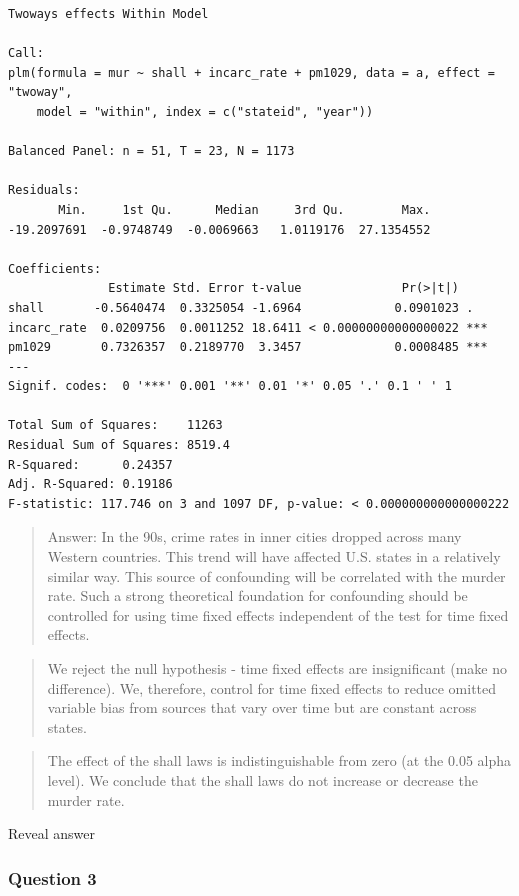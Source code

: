\documentclass[]{article}
\theoremstyle{definition}
\theoremstyle{definition}
\theoremstyle{definition}
\theoremstyle{remark}
\begin{document}
\begin{verbatim}
Twoways effects Within Model

Call:
plm(formula = mur ~ shall + incarc_rate + pm1029, data = a, effect = "twoway", 
    model = "within", index = c("stateid", "year"))

Balanced Panel: n = 51, T = 23, N = 1173

Residuals:
       Min.     1st Qu.      Median     3rd Qu.        Max. 
-19.2097691  -0.9748749  -0.0069663   1.0119176  27.1354552 

Coefficients:
              Estimate Std. Error t-value              Pr(>|t|)    
shall       -0.5640474  0.3325054 -1.6964             0.0901023 .  
incarc_rate  0.0209756  0.0011252 18.6411 < 0.00000000000000022 ***
pm1029       0.7326357  0.2189770  3.3457             0.0008485 ***
---
Signif. codes:  0 '***' 0.001 '**' 0.01 '*' 0.05 '.' 0.1 ' ' 1

Total Sum of Squares:    11263
Residual Sum of Squares: 8519.4
R-Squared:      0.24357
Adj. R-Squared: 0.19186
F-statistic: 117.746 on 3 and 1097 DF, p-value: < 0.000000000000000222
\end{verbatim}

\begin{quote}
Answer: In the 90s, crime rates in inner cities dropped across many
Western countries. This trend will have affected U.S. states in a
relatively similar way. This source of confounding will be correlated
with the murder rate. Such a strong theoretical foundation for
confounding should be controlled for using time fixed effects
independent of the test for time fixed effects.
\end{quote}

\begin{quote}
We reject the null hypothesis - time fixed effects are insignificant
(make no difference). We, therefore, control for time fixed effects to
reduce omitted variable bias from sources that vary over time but are
constant across states.
\end{quote}

\begin{quote}
The effect of the shall laws is indistinguishable from zero (at the 0.05
alpha level). We conclude that the shall laws do not increase or
decrease the murder rate.
\end{quote}

 Reveal answer

\subsubsection{Question 3}\label{question-3-2}
\end{document}
